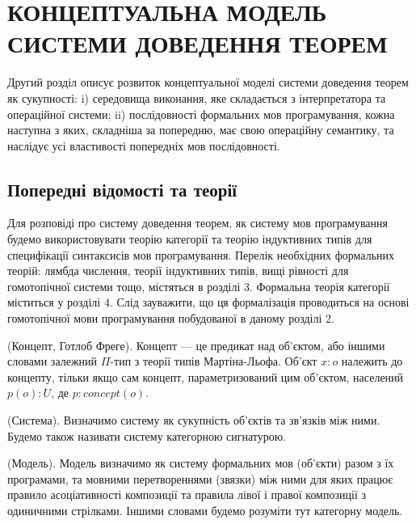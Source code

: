
\chapter{КОНЦЕПТУАЛЬНА МОДЕЛЬ \\ СИСТЕМИ ДОВЕДЕННЯ ТЕОРЕМ}
Другий розділ описує розвиток концептуальної моделі системи доведення теорем як сукупності:
i) середовища виконання, яке складається з інтерпретатора та операційної системи;
ii) послідовності формальних мов програмування,
кожна наступна з яких, складніша за попередню,
має свою операційну семантику, та наслідує усі властивості
попередніх мов послідовності.

\section{Попередні відомості та теорії}
Для розповіді про систему доведення теорем, як систему мов програмування
будемо використовувати теорію категорії та теорію індуктивних
типів для специфікації синтаксисів мов програмування. Перелік необхідних формальних теорій:
лямбда числення, теорії індуктивних типів, вищі рівності для гомотопічної системи
тощо, містяться в розділі 3. Формальна теорія категорії міститься у розділі 4.
Слід зауважити, що ця формалізація проводиться на основі гомотопічної
мови програмування побудованої в даному розділі 2.

\begin{definition} (Концепт, Готлоб Фреге).
Концепт --- це предикат над об'єктом, або
іншими словами залежний $\Pi$-тип з теорії типів Мартіна-Льофа.
Об'єкт $x : o$ належить до концепту, тільки якщо сам концепт,
параметризований цим об'єктом, населений $p(o):U$, де $p:concept(o)$.
\end{definition}

\begin{definition} (Система).
Визначимо систему як сукупність об'єктів та зв'язків між ними.
Будемо також називати систему категорною сигнатурою.
\end{definition}

\begin{definition} (Модель).
Модель визначимо як систему формальних мов (об'єкти) разом з їх програмами,
та мовними перетвореннями (звязки) між ними для яких працює правило асоціативності
композиції та правила лівої і правої композиції з одиничними стрілками.
Іншими словами будемо розуміти тут категорну модель.
\end{definition}

